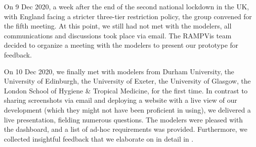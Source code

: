 
On 9 Dec 2020, a week after the end of the second national lockdown in the UK, with England facing a stricter three-tier restriction policy, the group convened for the fifth meeting.
At this point, we still had not met with the modelers, all communications and discussions took place via email.
The RAMPVis team decided to organize a meeting with the modelers to present our prototype for feedback.


On 10 Dec 2020, we finally met with modelers from Durham University, the University of Edinburgh, the University of Exeter, the University of Glasgow, the London School of Hygiene \& Tropical Medicine, for the first time.
In contrast to sharing screenshots via email and deploying a website with a live view of our development (which they might not have been proficient in using), we delivered a live presentation, fielding numerous questions.
The modelers were pleased with the dashboard, and a list of ad-hoc requirements was provided. Furthermore, we collected insightful feedback that we elaborate on in detail in .
\begingroup
